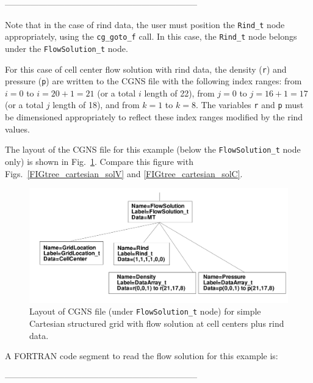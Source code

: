 \documentclass[12pt]{article}
\begin{document}
--------------------------------------------------------------------

\noindent Note that in the case of rind data, the user must
position the {\tt Rind\_t} node appropriately, using the
{\tt cg\_goto\_f} call.  In this case, the {\tt Rind\_t} node belongs under
the {\tt FlowSolution\_t} node.

For this case of cell center flow solution
with rind data, the density ({\tt r}) and pressure ({\tt p})
are written to the CGNS file with the following index ranges:
from $i=0$ to $i=20+1=21$ (or a total $i$
length of 22), from $j=0$ to $j=16+1=17$ (or a total $j$
length of 18), and from $k=1$ to $k=8$.  The variables {\tt r} and {\tt p} must
be dimensioned appropriately to reflect these index ranges
modified by the rind values.

The layout of the CGNS file for this example (below the
{\tt FlowSolution\_t} node only) is shown in
Fig.~\ref{FIGtree_cartesian_solCR}.  Compare this figure with
Figs.~\ref{FIGtree_cartesian_solV} and \ref{FIGtree_cartesian_solC}.

\begin{figure}[hpbt]
\centerline{{\includegraphics[width=150mm]{figures/tree_cartesian_solCR}}}
\caption{Layout of CGNS file (under {\tt FlowSolution\_t} node)
for simple Cartesian structured grid with flow solution at cell
centers plus rind data.}
\label{FIGtree_cartesian_solCR}
\end{figure}
%

A FORTRAN code segment to read the flow solution for this example is:

--------------------------------------------------------------------
\end{document}
